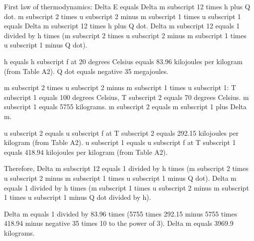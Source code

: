 First law of thermodynamics:  
Delta E equals Delta m subscript 12 times h plus Q dot.  
m subscript 2 times u subscript 2 minus m subscript 1 times u subscript 1 equals Delta m subscript 12 times h plus Q dot.  
Delta m subscript 12 equals 1 divided by h times (m subscript 2 times u subscript 2 minus m subscript 1 times u subscript 1 minus Q dot).  

h equals h subscript f at 20 degrees Celsius equals 83.96 kilojoules per kilogram (from Table A2).  
Q dot equals negative 35 megajoules.  

m subscript 2 times u subscript 2 minus m subscript 1 times u subscript 1:  
T subscript 1 equals 100 degrees Celsius, T subscript 2 equals 70 degrees Celsius.  
m subscript 1 equals 5755 kilograms.  
m subscript 2 equals m subscript 1 plus Delta m.  

u subscript 2 equals u subscript f at T subscript 2 equals 292.15 kilojoules per kilogram (from Table A2).  
u subscript 1 equals u subscript f at T subscript 1 equals 418.94 kilojoules per kilogram (from Table A2).  

Therefore, Delta m subscript 12 equals 1 divided by h times (m subscript 2 times u subscript 2 minus m subscript 1 times u subscript 1 minus Q dot).  
Delta m equals 1 divided by h times (m subscript 1 times u subscript 2 minus m subscript 1 times u subscript 1 minus Q dot divided by h).  

Delta m equals 1 divided by 83.96 times (5755 times 292.15 minus 5755 times 418.94 minus negative 35 times 10 to the power of 3).  
Delta m equals 3969.9 kilograms.